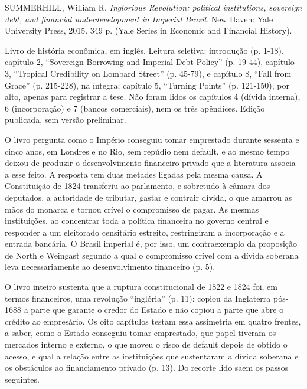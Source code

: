 
\begin{identificacao}
SUMMERHILL, William R. \textit{Inglorious Revolution: political institutions, sovereign debt, and financial underdevelopment in Imperial Brazil}. New Haven: Yale University Press, 2015. 349 p. (Yale Series in Economic and Financial History).

Livro de história econômica, em inglês. Leitura seletiva: introdução (p. 1-18), capítulo 2, ``Sovereign Borrowing and Imperial Debt Policy'' (p. 19-44), capítulo 3, ``Tropical Credibility on Lombard Street'' (p. 45-79), e capítulo 8, ``Fall from Grace'' (p. 215-228), na íntegra; capítulo 5, ``Turning Points'' (p. 121-150), por alto, apenas para registrar a tese. Não foram lidos os capítulos 4 (dívida interna), 6 (incorporação) e 7 (bancos comerciais), nem os três apêndices. Edição publicada, sem versão preliminar.
\end{identificacao}

O livro pergunta como o Império conseguiu tomar emprestado durante sessenta e cinco anos, em Londres e no Rio, sem repúdio nem default, e ao mesmo tempo deixou de produzir o desenvolvimento financeiro privado que a literatura associa a esse feito. A resposta tem duas metades ligadas pela mesma causa. A Constituição de 1824 transferiu ao parlamento, e sobretudo à câmara dos deputados, a autoridade de tributar, gastar e contrair dívida, o que amarrou as mãos do monarca e tornou crível o compromisso de pagar. As mesmas instituições, ao concentrar toda a política financeira no governo central e responder a um eleitorado censitário estreito, restringiram a incorporação e a entrada bancária. O Brasil imperial é, por isso, um contraexemplo da proposição de North e Weingast segundo a qual o compromisso crível com a dívida soberana leva necessariamente ao desenvolvimento financeiro (p. 5).

O livro inteiro sustenta que a ruptura constitucional de 1822 e 1824 foi, em termos financeiros, uma revolução ``inglória'' (p. 11): copiou da Inglaterra pós-1688 a parte que garante o credor do Estado e não copiou a parte que abre o crédito ao empresário. Os oito capítulos testam essa assimetria em quatro frentes, a saber, como o Estado conseguiu tomar emprestado, que papel tiveram os mercados interno e externo, o que moveu o risco de default depois de obtido o acesso, e qual a relação entre as instituições que sustentaram a dívida soberana e os obstáculos ao financiamento privado (p. 13). Do recorte lido saem os passos seguintes.


